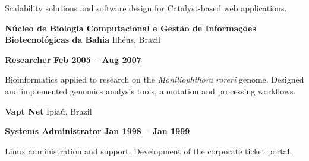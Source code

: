 \documentclass[a4paper,oneside]{memoir}
\begin{document}
\begin{multicols}{2}
\begin{flushleft}
\scriptsize

Scalability solutions and software design for Catalyst-based web applications.

\normalsize

\textbf{\color{RoyalBlue}Núcleo de Biologia Computacional e Gestão de Informações Biotecnológicas da Bahia} \footnotesize Ilhéus, Brazil\normalsize

\textbf{Researcher}
\footnotesize\textbf{Feb 2005 -- Aug 2007}\normalsize

\scriptsize

Bioinformatics applied to research on the \emph{Moniliophthora roreri} genome.
Designed and implemented genomics analysis tools, annotation and processing
workflows.

\normalsize

\textbf{\color{RoyalBlue}Vapt Net} \footnotesize Ipiaú, Brazil\normalsize

\textbf{Systems Administrator}
\footnotesize\textbf{Jan 1998 -- Jan 1999}\normalsize

\scriptsize

Linux administration and support. Development of the corporate ticket portal.

\end{flushleft}

\end{multicols}
\end{document}
